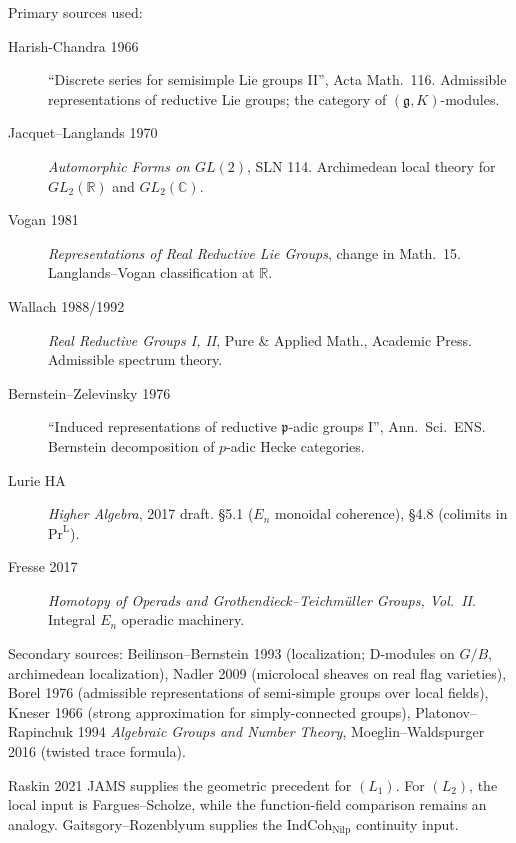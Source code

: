 Primary sources used:
\begin{description}
\item[Harish-Chandra 1966] ``Discrete series for semisimple Lie
groups II'', Acta Math.\ 116. Admissible representations of
reductive Lie groups; the category of \((\mathfrak{g}, K)\)-modules.
\item[Jacquet--Langlands 1970] \emph{Automorphic Forms on \(GL(2)\)},
SLN 114. Archimedean local theory for \(GL_{2}(\mathbb{R})\) and
\(GL_{2}(\mathbb{C})\).
\item[Vogan 1981] \emph{Representations of Real Reductive Lie
Groups}, change in Math.\ 15. Langlands--Vogan classification at
\(\mathbb{R}\).
\item[Wallach 1988/1992] \emph{Real Reductive Groups I, II}, Pure
\& Applied Math., Academic Press. Admissible spectrum theory.
\item[Bernstein--Zelevinsky 1976] ``Induced representations of
reductive \(\mathfrak{p}\)-adic groups I'', Ann.\ Sci.\ ENS.
Bernstein decomposition of \(p\)-adic Hecke categories.
\item[Lurie HA] \emph{Higher Algebra}, 2017 draft. \S5.1 (\(E_{n}\)
monoidal coherence), \S4.8 (colimits in \(\mathrm{Pr}^{\mathrm{L}}\)).
\item[Fresse 2017] \emph{Homotopy of Operads and Grothendieck--Teichm\"uller
Groups, Vol.\ II}. Integral \(E_{n}\) operadic
machinery.
\end{description}

Secondary sources: Beilinson--Bernstein 1993 (localization;
D-modules on \(G/B\), archimedean localization), Nadler 2009
(microlocal sheaves on real flag varieties), Borel 1976
(admissible representations of semi-simple groups over local
fields), Kneser 1966 (strong approximation for simply-connected
groups), Platonov--Rapinchuk 1994 \emph{Algebraic Groups and
Number Theory}, Moeglin--Waldspurger 2016 (twisted trace
formula).

Raskin 2021 JAMS supplies the geometric precedent for \((L_{1})\).
For \((L_{2})\), the local input is Fargues--Scholze, while the
function-field comparison remains an analogy. Gaitsgory--Rozenblyum
supplies the \(\mathrm{IndCoh}_{\mathrm{Nilp}}\) continuity input.

